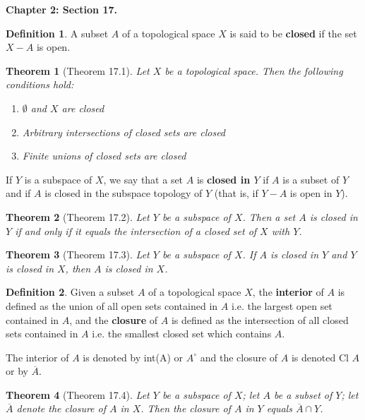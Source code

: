 \documentclass{article}
\newtheorem{theorem}{Theorem}
\theoremstyle{definition}
\newtheorem{definition}{Definition}[section]
\theoremstyle{remark}
\newcommand{\inter}[1]{int(#1)}
\begin{document}
    \newpage

    \textbf{Chapter 2: Section 17.}
    \begin{definition}
        A subset $A$ of a topological space $X$ is said to be \textbf{closed} if the set $X-A$ is open.
    \end{definition}

    \begin{theorem}[Theorem 17.1]
        Let $X$ be a topological space. Then the following conditions hold:
        \begin{enumerate}
            \item $\emptyset$ and $X$ are closed
            \item Arbitrary intersections of closed sets are closed
            \item Finite unions of closed sets are closed
        \end{enumerate}
    \end{theorem}

    If $Y$ is a subspace of $X$, we say that a set $A$ is \textbf{closed in $Y$} if $A$ is a subset of $Y$ and if $A$ is closed 
    in the subspace topology of $Y$ (that is, if $Y-A$ is open in $Y$).

    \begin{theorem}[Theorem 17.2]
        Let $Y$ be a subspace of $X$. Then a set $A$ is closed in $Y$ if and only if it equals the intersection of a closed set of
        $X$ with $Y$.
    \end{theorem}

    \begin{theorem}[Theorem 17.3]
        Let $Y$ be a subspace of $X$. If $A$ is closed in $Y$ and $Y$ is closed in $X$, then $A$ is closed in $X$.
    \end{theorem}

    \begin{definition}
        Given a subset $A$ of a topological space $X$, the \textbf{interior} of $A$ is defined as the union of all open sets
        contained in $A$ i.e. the largest open set contained in $A$, and the \textbf{closure} of $A$ is defined as the intersection
        of all closed sets contained in $A$ i.e. the smallest closed set which contains $A$.
    \end{definition}

    The interior of $A$ is denoted by \inter{A} or $A^{\circ}$ and the closure of $A$ is denoted Cl $A$ or by $\overline{A}$.

    \begin{theorem}[Theorem 17.4]
        Let $Y$ be a subspace of $X$; let $A$ be a subset of $Y$; let $\overline{A}$ denote the closure of $A$ in $X$. Then the closure
        of $A$ in $Y$ equals $\overline{A}\cap Y$.
    \end{theorem}
\end{document}
